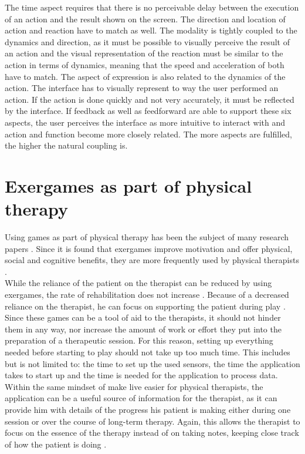The time aspect requires that there is no perceivable delay between the execution of an action and the result shown on the screen. The direction and location of action and reaction have to match as well. The modality is tightly coupled to the dynamics and direction, as it must be possible to visually perceive the result of an action and the visual representation of the reaction must be similar to the action in terms of dynamics, meaning that the speed and acceleration of both have to match. The aspect of expression is also related to the dynamics of the action. The interface has to visually represent to way the user performed an action. If the action is done quickly and not very accurately, it must be reflected by the interface. If feedback as well as feedforward are able to support these six aspects, the user perceives the interface as more intuitive to interact with and action and function become more closely related. The more aspects are fulfilled, the higher the natural coupling is. \cite{Wensveen2004}\\


\section{Exergames as part of physical therapy}

Using games as part of physical therapy has been the subject of many research papers \cite{Geurts2011}\cite{Hondori2014}\cite{Lange2012}\cite{Chang2011}. Since it is found that exergames improve motivation \cite{Brauner2013} and offer physical, social and cognitive benefits, they are more frequently used by physical therapists \cite{Peng2011}\cite{Staiano2011}.\\

While the reliance of the patient on the therapist can be reduced by using exergames, the rate of rehabilitation does not increase \cite{Dahl2014}. Because of a decreased reliance on the therapist, he can focus on supporting the patient during play \cite{Annema2013}. Since these games can be a tool of aid to the therapists, it should not hinder them in any way, nor increase the amount of work or effort they put into the preparation of a therapeutic session. For this reason, setting up everything needed before starting to play should not take up too much time. This includes but is not limited to: the time to set up the used sensors, the time the application takes to start up and the time is needed for the application to process data.\\

Within the same mindset of make live easier for physical therapists, the application can be a useful source of information for the therapist, as it can provide him with details of the progress his patient is making either during one session or over the course of long-term therapy. Again, this allows the therapist to focus on the essence of the therapy instead of on taking notes, keeping close track of how the patient is doing \cite{Annema2013}.\\